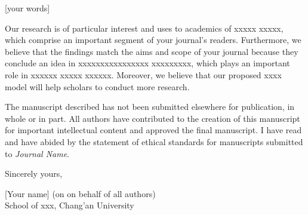 \documentclass{article}
\begin{document}
[your words]

Our research is of particular interest and uses to academics of xxxxx xxxxx, which comprise an important segment of your journal's readers. Furthermore, we believe that the findings match the aims and scope of your journal because they conclude an idea in xxxxxxxxxxxxxxxx xxxxxxxxx, which plays an important role in xxxxxx xxxxx xxxxxx. Moreover, we believe that our proposed xxxx model will help scholars to conduct more research.

The manuscript described has not been submitted elsewhere for publication, in whole or in part. All authors have contributed to the creation of this manuscript for important intellectual content and approved the final manuscript. I have read and have abided by the statement of ethical standards for manuscripts submitted to \textit{Journal Name}.

\bigskip %

Sincerely yours,

\vspace{20pt} %

[Your name] (on on behalf of all authors)\\
School of xxx, Chang'an University
\end{document}
